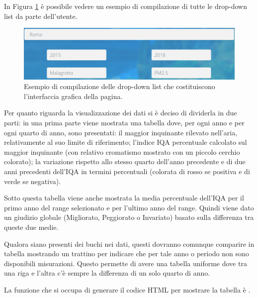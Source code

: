 In Figura \ref{fig:ux} è possibile vedere un esempio di compilazione di tutte
le drop-down list da parte dell'utente.

\begin{figure}[htb]
	\centering
	\includegraphics[width=\textwidth]{img/ux}
	\caption{Esempio di compilazione delle drop-down list che costituiscono
	l'interfaccia grafica della pagina.}\label{fig:ux}
\end{figure}

Per quanto riguarda la visualizzazione dei dati si è deciso di dividerla in due
parti: in una prima parte viene mostrata una tabella dove, per ogni anno e per
ogni quarto di anno, sono presentati: il maggior inquinante rilevato nell'aria,
relativamente al suo limite di riferimento; l'indice IQA percentuale calcolato
sul maggior inquinante (con relativo cromatismo mostrato con un piccolo cerchio
colorato); la variazione rispetto allo stesso quarto dell'anno precedente e di
due anni precedenti dell'IQA in termini percentuali (colorata di rosso se
positiva e di verde se negativa).

Sotto questa tabella viene anche mostrata la media percentuale dell'IQA per il
primo anno del range selezionato  e per
l'ultimo anno del range. Quindi viene dato un giudizio globale (Migliorato,
Peggiorato o Invariato) basato sulla differenza tra queste due medie.

Qualora siano presenti dei buchi nei dati, questi dovranno comunque comparire in
tabella mostrando un trattino per indicare che per tale anno o periodo non sono
disponibili misurazioni. Questo permette di avere una tabella uniforme dove tra
una riga e l'altra c'è sempre la differenza di un solo quarto di anno.

La funzione che si occupa di generare il codice HTML per mostrare la tabella è
.

